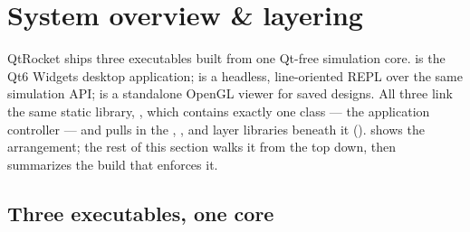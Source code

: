 \section{System overview \& layering}\label{sec:overview}

QtRocket ships three executables built from one Qt-free simulation core.  is
the Qt6 Widgets desktop application;  is a headless, line-oriented REPL
over the same simulation API;  is a standalone OpenGL viewer for
saved designs. All three link the same static library, , which contains
exactly one class --- the  application controller --- and pulls in the
, , and  layer libraries beneath it
().  shows the arrangement; the rest of
this section walks it from the top down, then summarizes the build that enforces it.


\subsection{Three executables, one core}\label{sec:overview-executables}

